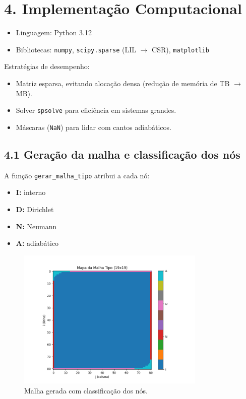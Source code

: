 \documentclass[12pt]{article}
\begin{document}
\section*{4. Implementação Computacional}

\begin{itemize}
    \item Linguagem: Python 3.12
    \item Bibliotecas: \texttt{numpy}, \texttt{scipy.sparse} (LIL $\rightarrow$ CSR), \texttt{matplotlib}
\end{itemize}

Estratégias de desempenho:
\begin{itemize}
    \item Matriz esparsa, evitando alocação densa (redução de memória de TB $\rightarrow$ MB).
    \item Solver \texttt{spsolve} para eficiência em sistemas grandes.
    \item Máscaras (\texttt{NaN}) para lidar com cantos adiabáticos.
\end{itemize}

\subsection*{4.1 Geração da malha e classificação dos nós}

A função \texttt{gerar\_malha\_tipo} atribui a cada nó:
\begin{itemize}
    \item \textbf{I:} interno
    \item \textbf{D:} Dirichlet
    \item \textbf{N:} Neumann
    \item \textbf{A:} adiabático
\end{itemize}

\begin{figure}[H]
    \centering
    \includegraphics[width=0.8\textwidth]{img/Figure_2.png}
    \caption{Malha gerada com classificação dos nós.}
\end{figure}
\end{document}
